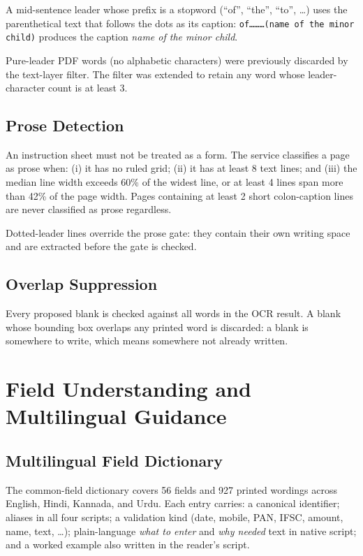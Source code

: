 \documentclass[conference]{IEEEtran}
\begin{document}
A mid-sentence leader whose prefix is a stopword (``of'', ``the'', ``to'', \dots) uses the parenthetical text that follows the dots as its caption: \texttt{of………(name of the minor child)} produces the caption \textit{name of the minor child}.

Pure-leader PDF words (no alphabetic characters) were previously discarded by the text-layer filter. The filter was extended to retain any word whose leader-character count is at least 3.

\subsection{Prose Detection}

An instruction sheet must not be treated as a form. The service classifies a page as prose when: (i) it has no ruled grid; (ii) it has at least 8 text lines; and (iii) the median line width exceeds 60\% of the widest line, or at least 4 lines span more than 42\% of the page width. Pages containing at least 2 short colon-caption lines are never classified as prose regardless.

Dotted-leader lines override the prose gate: they contain their own writing space and are extracted before the gate is checked.

\subsection{Overlap Suppression}

Every proposed blank is checked against all words in the OCR result. A blank whose bounding box overlaps any printed word is discarded: a blank is somewhere to write, which means somewhere not already written.

\section{Field Understanding and Multilingual Guidance}
\label{sec:understanding}

\subsection{Multilingual Field Dictionary}

The common-field dictionary covers 56 fields and 927 printed wordings across English, Hindi, Kannada, and Urdu. Each entry carries: a canonical identifier; aliases in all four scripts; a validation kind (date, mobile, PAN, IFSC, amount, name, text, \dots); plain-language \textit{what to enter} and \textit{why needed} text in native script; and a worked example also written in the reader's script.
\end{document}
